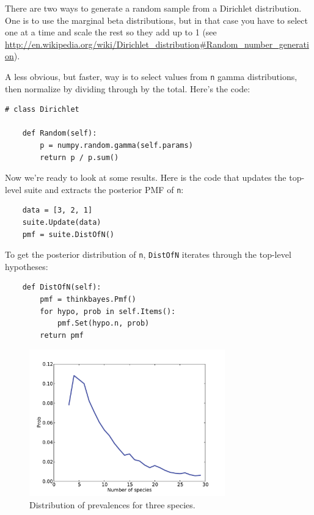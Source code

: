 \documentclass[12pt]{book}
\begin{document}
There are two ways to generate a random sample from a Dirichlet
distribution.  One is to use the marginal beta distributions, but in
that case you have to select one at a time and scale the rest so they
add up to 1 (see
\url{http://en.wikipedia.org/wiki/Dirichlet_distribution#Random_number_generation}).

A less obvious, but faster, way is to select values from {\tt n} gamma
distributions, then normalize by dividing through by the total. 
Here's the code:

\begin{verbatim}
# class Dirichlet

    def Random(self):
        p = numpy.random.gamma(self.params)
        return p / p.sum()
\end{verbatim}

Now we're ready to look at some results.  Here is the code that
updates the top-level suite and extracts the posterior PMF of {\tt n}:

\begin{verbatim}
    data = [3, 2, 1]
    suite.Update(data)
    pmf = suite.DistOfN()
\end{verbatim}

To get the posterior distribution of {\tt n}, {\tt DistOfN} iterates
through the top-level hypotheses:

\begin{verbatim}
    def DistOfN(self):
        pmf = thinkbayes.Pmf()
        for hypo, prob in self.Items():
            pmf.Set(hypo.n, prob)
        return pmf
\end{verbatim}

\begin{figure}
\centerline{\includegraphics[height=2.5in]{figs/species2.pdf}}
\caption{Distribution of prevalences for three species.}
\label{fig.species2}
\end{figure}
\end{document}
